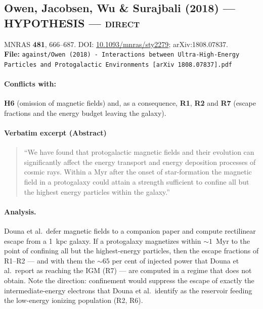 \documentclass[11pt,a4paper]{article}
\newcommand{\HYP}{\textcolor{blue!60!black}{\textbf{HYPOTHESIS}}}
\begin{document}
\subsection{Owen, Jacobsen, Wu \& Surajbali (2018) --- \HYP{} --- \textsc{direct}}
\noindent MNRAS \textbf{481}, 666--687. DOI:
\href{https://doi.org/10.1093/mnras/sty2279}{10.1093/mnras/sty2279};
arXiv:1808.07837.\\
\textbf{File:} \texttt{against/Owen (2018) - Interactions between Ultra-High-Energy Particles and Protogalactic Environments [arXiv 1808.07837].pdf}

\paragraph{Conflicts with:} \textbf{H6} (omission of magnetic fields) and, as a
consequence, \textbf{R1}, \textbf{R2} and \textbf{R7} (escape fractions and the
energy budget leaving the galaxy).

\paragraph{Verbatim excerpt (Abstract)}
\begin{quote}\small
``We have found that protogalactic magnetic fields and their evolution can
significantly affect the energy transport and energy deposition processes of
cosmic rays. Within a Myr after the onset of star-formation the magnetic field
in a protogalaxy could attain a strength sufficient to confine all but the
highest energy particles within the galaxy.''
\end{quote}

\paragraph{Analysis.}
Douna et al.\ defer magnetic fields to a companion paper and compute
rectilinear escape from a 1~kpc galaxy. If a protogalaxy magnetizes within
$\sim1$~Myr to the point of confining all but the highest-energy particles,
then the escape fractions of R1--R2 --- and with them the $\sim65$ per cent of
injected power that Douna et al.\ report as reaching the IGM (R7) --- are
computed in a regime that does not obtain. Note the direction: confinement
would suppress the escape of exactly the intermediate-energy electrons that
Douna et al.\ identify as the reservoir feeding the low-energy ionizing
population (R2, R6).
\end{document}
